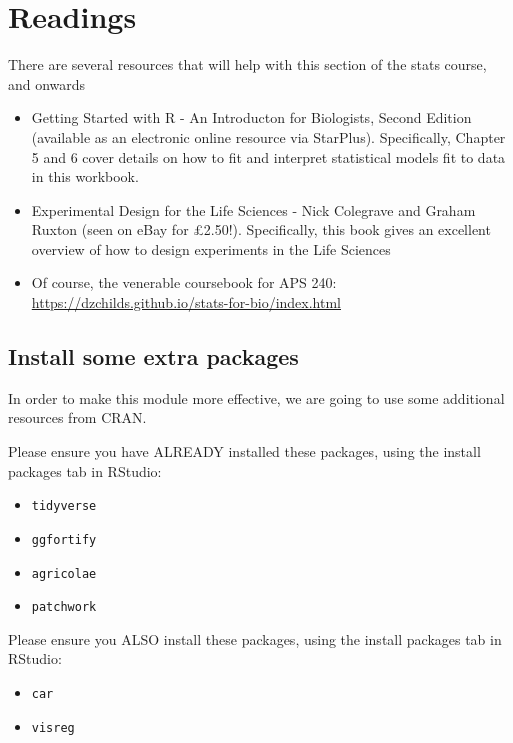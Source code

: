 \documentclass[
]{book}
\providecommand{\tightlist}{%
  \setlength{\itemsep}{0pt}\setlength{\parskip}{0pt}}
\begin{document}
\chapter{Readings}\label{readings}

There are several resources that will help with this section of the stats course, and onwards

\begin{itemize}
\tightlist
\item
  Getting Started with R - An Introducton for Biologists, Second Edition (available as an electronic online resource via StarPlus). Specifically, Chapter 5 and 6 cover details on how to fit and interpret statistical models fit to data in this workbook.
\item
  Experimental Design for the Life Sciences - Nick Colegrave and Graham Ruxton (seen on eBay for £2.50!). Specifically, this book gives an excellent overview of how to design experiments in the Life Sciences
\item
  Of course, the venerable coursebook for APS 240: \url{https://dzchilds.github.io/stats-for-bio/index.html}
\end{itemize}

\section{Install some extra packages}\label{install-some-extra-packages}

In order to make this module more effective, we are going to use some additional resources from CRAN.

Please ensure you have ALREADY installed these packages, using the install packages tab in RStudio:

\begin{itemize}
\tightlist
\item
  \texttt{tidyverse}
\item
  \texttt{ggfortify}
\item
  \texttt{agricolae}
\item
  \texttt{patchwork}
\end{itemize}

Please ensure you ALSO install these packages, using the install packages tab in RStudio:

\begin{itemize}
\tightlist
\item
  \texttt{car}
\item
  \texttt{visreg}
\end{itemize}
\end{document}

